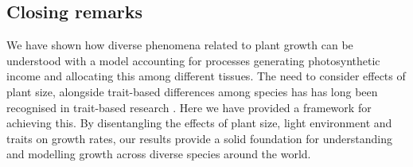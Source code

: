 \documentclass[9pt,twocolumn,twoside,lineno]{pnas-new}
\begin{document}
\subsection{Closing remarks}

We have shown how diverse phenomena related to plant growth can be understood with a model accounting for processes generating photosynthetic income and allocating this among different tissues. The need to consider effects of plant size, alongside trait-based differences among species has has long been recognised in trait-based research \cite[e.g.][]{Givnish-1988, Thomas-1999, Moorcroft-2001, Westoby-2002, Enquist-2007}. Here we have provided a framework for achieving this. By disentangling the effects of plant size, light environment and traits on growth rates, our results provide a solid  foundation for understanding and modelling growth across diverse species around the world.
\end{document}
